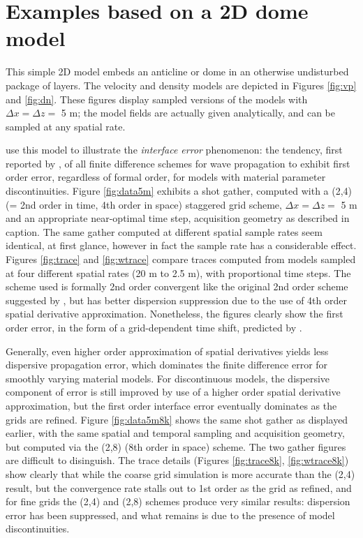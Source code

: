 \section{Examples based on a 2D dome model}

This simple 2D model embeds an anticline or dome in an otherwise
undisturbed package of layers. The velocity and density models are
depicted in Figures \ref{fig:vp} and \ref{fig:dn}. These
figures display sampled versions of the models with $\Delta x = \Delta
z = $ 5 m; the model fields are actually given analytically, and can
be sampled at any spatial rate.

\cite{SymesVdovina:09} use this model to illustrate the {\em
  interface error} phenomenon: the tendency, first reported by
\cite{Brown:84}, of all finite difference schemes for wave
propagation to exhibit first order error, regardless of formal order,
for models with material parameter discontinuities. 
Figure \ref{fig:data5m} exhibits a shot gather, computed with a (2,4) (= 2nd order in time,
4th order in space) staggered grid scheme, $\Delta
x = \Delta z = $ 5 m and an appropriate near-optimal time step, acquisition geometry as described in
caption. The same gather computed at different spatial sample rates
seem identical, at first glance, however in fact the sample rate has a considerable effect. Figures
\ref{fig:trace} and \ref{fig:wtrace} compare traces computed from models sampled
at four different spatial rates (20 m to 2.5 m), with proportional
time steps. The scheme used is formally 2nd order
convergent like the original 2nd order scheme suggested by
\cite{Vir:84}, but has better dispersion suppression due to the use of
4th order spatial derivative approximation. Nonetheless,
the figures clearly show the first order error, in the form of a
grid-dependent time shift, predicted by \cite{Brown:84}. 

Generally, even higher order approximation of spatial derivatives
yields less dispersive propagation error, which dominates the finite
difference error for smoothly varying material models. For
discontinuous models, the dispersive component of error is still
improved by use of a higher order spatial derivative approximation,
but the first order interface error eventually dominates as the grids
are refined. Figure \ref{fig:data5m8k} shows the same shot gather as
displayed earlier, with the same spatial and temporal sampling and
acquisition geometry, but computed via the (2,8) (8th order in space)
scheme. The two gather figures are difficult to disinguish. The trace
details (Figures \ref{fig:trace8k}, \ref{fig:wtrace8k}) show clearly
that while the coarse grid simulation is more accurate than the (2,4)
result, but the convergence rate stalls out to 1st order as the grid
as refined, and for fine grids the (2,4) and (2,8) schemes produce
very similar results: dispersion error has been suppressed, and what
remains is due to the presence of model discontinuities.

